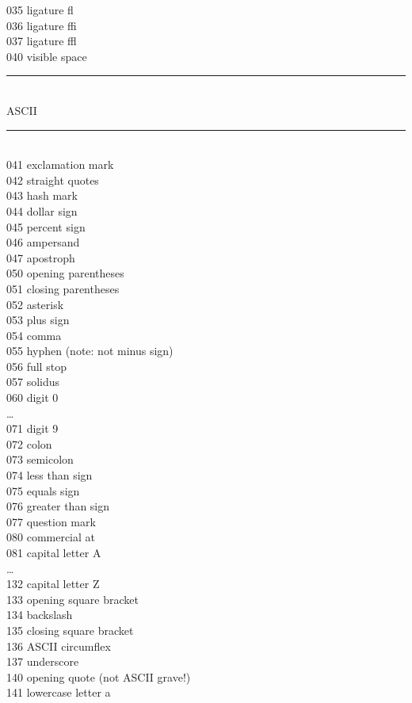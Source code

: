\documentclass{article}
\renewcommand{\-}{\discretionary{\char'0177 }{}{}}
\begin{document}
\begin{tabbing}
035 \> ligature fl\\
036 \> ligature ffi\\
037 \> ligature ffl\\
040 \> visible space\\
\rule{\linewidth}{.4pt}\>\\
ASCII\>\\
\rule{\linewidth}{.4pt}\>\\
041 \> exclamation mark\\
042 \> straight quotes\\
043 \> hash mark\\
044 \> dollar sign\\
045 \> percent sign\\
046 \> ampersand\\
047 \> apostroph\\
050 \> opening parentheses\\
051 \> closing parentheses\\
052 \> asterisk\\
053 \> plus sign\\
054 \> comma\\
055 \> hyphen (note: not minus sign)\\
056 \> full stop\\
057 \> solidus\\
060 \> digit 0\\
\dots\> \\
071 \> digit 9\\
072 \> colon\\
073 \> semicolon\\
074 \> less than sign\\
075 \> equals sign\\
076 \> greater than sign\\
077 \> question mark\\
080 \> commercial at\\
081 \> capital letter A\\
\dots\>\\
132 \> capital letter Z\\
133 \> opening square bracket\\
134 \> backslash\\
135 \> closing square bracket\\
136 \> ASCII circumflex\\
137 \> underscore\\
140 \> opening quote (not ASCII grave!)\\
141 \> lowercase letter a\\

\end{tabbing}
\end{document}
